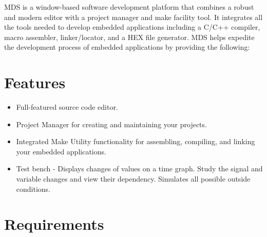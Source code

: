 MDS is a window-based software development platform that combines a robust and modern editor with a project manager and make facility tool. It integrates all the tools needed to develop embedded applications including a C/C++ compiler, macro assembler, linker/locator, and a HEX file generator. MDS helps expedite the development process of embedded applications by providing the following:

\section{Features}
    \begin{itemize}
        \item Full-featured source code editor.
        \item Project Manager for creating and maintaining your projects.
        \item Integrated Make Utility functionality for assembling, compiling, and linking your embedded applications.
        \item Test bench - Displays changes of values on a time graph. Study the signal and variable changes and view their dependency. Simulates all possible outside conditions.
    \end{itemize}

\section{Requirements}
